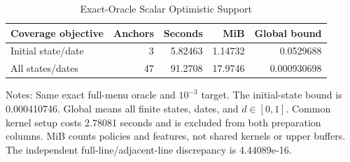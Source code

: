 \begin{table}[!htbp]
\centering\small
\caption{Exact-Oracle Scalar Optimistic Support}
\label{tab:r6_ols}
\begin{tabular}{lrrrr}
\toprule
Coverage objective & Anchors & Seconds & MiB & Global bound \\
\midrule
Initial state/date & 3 & 5.82463 & 1.14732 & 0.0529688 \\
All states/dates & 47 & 91.2708 & 17.9746 & 0.000930698 \\
\bottomrule
\end{tabular}
\par\smallskip
\begin{minipage}{0.98\linewidth}\footnotesize
Notes: Same exact full-menu oracle and $10^{-3}$ target. The initial-state bound is 0.000410746. Global means all finite states, dates, and $d\in[0,1]$. Common kernel setup costs 2.78081 seconds and is excluded from both preparation columns. MiB counts policies and features, not shared kernels or upper buffers. The independent full-line/adjacent-line discrepancy is 4.44089e-16.
\end{minipage}
\end{table}
